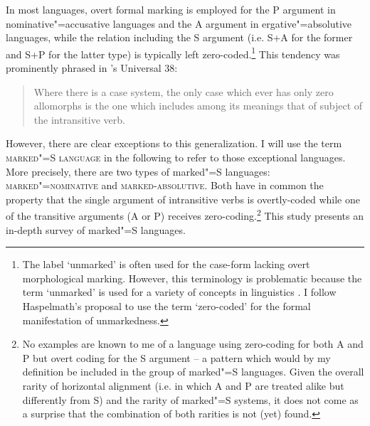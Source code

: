 In most languages, overt formal marking is employed for the P argument in nominative"=accusative languages and the A argument in ergative"=absolutive languages, while the relation including the S argument (i.e. S+A for the former and S+P for the latter type) is typically left zero-coded.\footnote{The label `unmarked' is often used for the case-form lacking overt morphological marking. 
However, this terminology is problematic because the term `unmarked' is used for a variety of concepts in linguistics \citep{Haspelmath.mark:2006}. 
I follow Haspelmath's proposal to use the term `zero-coded' for the formal manifestation of unmarkedness.}  
This tendency was prominently phrased in \citeauthor{Greenberg:1963}'s Universal 38:

\begin{quote} Where there is a case system, the only case which ever has only zero allomorphs is the one which includes among its meanings that of subject of the intransitive verb.
\citep[75]{Greenberg:1963}
\end{quote}  

However, there are clear exceptions to this generalization. 
I will use the term \textsc{marked"=S language} in the following to refer to those exceptional languages. 
More precisely, there are two types of marked"=S languages: \textsc{marked"=nominative} and \textsc{marked-absolutive}. 
Both have in common the property that the single argument of intransitive verbs is overtly-coded while one of the transitive arguments (A or P) receives zero-coding.\footnote{No examples are known to me of a language using zero-coding for both A and P but overt coding for the S argument -- a pattern which would by my definition be included in the group of marked"=S languages. 
Given the overall rarity of horizontal alignment (i.e. in which A and P are treated alike but differently from S) and the rarity of marked"=S systems, it does not come as a surprise that the combination of both rarities is not (yet) found.} 
This study presents an in-depth survey of marked"=S languages.

